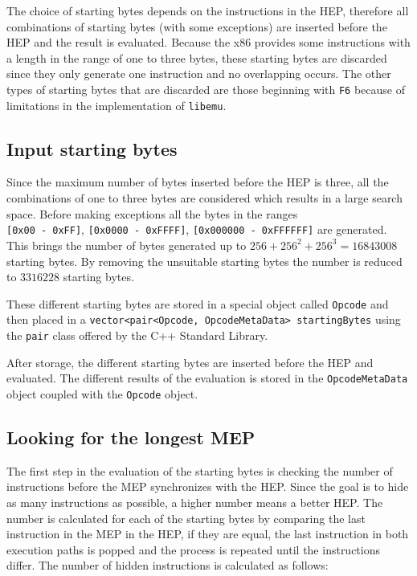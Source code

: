 \documentclass[11pt,twoside]{eitExjobb}
\begin{document}
The choice of starting bytes depends on the instructions in the HEP, therefore all combinations of starting bytes (with some exceptions) are inserted before the HEP and the result is evaluated. Because the x86 provides some instructions with a length in the range of one to three bytes, these starting bytes are discarded since they only generate one instruction and no overlapping occurs. The other types of starting bytes that are discarded are those beginning with \texttt{F6} because of limitations in the implementation of \texttt{libemu}.


\subsection{Input starting bytes}
Since the maximum number of bytes inserted before the HEP is three, all the combinations of one to three bytes are considered which results in a large search space. Before making exceptions all the bytes in the ranges\\ 
\texttt{[0x00 - 0xFF]}, \texttt{[0x0000 - 0xFFFF]}, \texttt{[0x000000 - 0xFFFFFF]} are generated. This brings the number of bytes generated up to $256 + 256^2 + 256^3 = 16843008$ starting bytes. By removing the unsuitable starting bytes the number is reduced to $3316228$ starting bytes.

These different starting bytes are stored in a special object called \texttt{Opcode} and then placed in a \texttt{vector<pair<Opcode, OpcodeMetaData> startingBytes} using the \texttt{pair} class offered by the C++ Standard Library.

After storage, the different starting bytes are inserted before the HEP and evaluated. The different results of the evaluation is stored in the \texttt{OpcodeMetaData} object coupled with the \texttt{Opcode} object. 

\subsection{Looking for the longest MEP}
The first step in the evaluation of the starting bytes is checking the number of instructions before the MEP synchronizes with the HEP. Since the goal is to hide as many instructions as possible, a higher number means a better HEP. The number is calculated for each of the starting bytes by comparing the last instruction in the MEP in the HEP, if they are equal, the last instruction in both execution paths is popped and the process is repeated until the instructions differ. The number of hidden instructions is calculated as follows:
\end{document}
